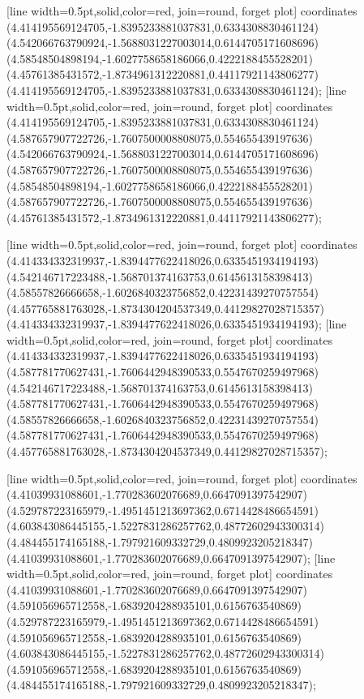 [line width=0.5pt,solid,color=red, join=round, forget plot] coordinates {(4.414195569124705,-1.8395233881037831,0.6334308830461124) (4.542066763790924,-1.5688031227003014,0.6144705171608696) (4.58548504898194,-1.6027758658186066,0.4222188455528201) (4.45761385431572,-1.8734961312220881,0.44117921143806277) (4.414195569124705,-1.8395233881037831,0.6334308830461124)};
[line width=0.5pt,solid,color=red, join=round, forget plot] coordinates {(4.414195569124705,-1.8395233881037831,0.6334308830461124) (4.587657907722726,-1.7607500008808075,0.554655439197636) (4.542066763790924,-1.5688031227003014,0.6144705171608696) (4.587657907722726,-1.7607500008808075,0.554655439197636) (4.58548504898194,-1.6027758658186066,0.4222188455528201) (4.587657907722726,-1.7607500008808075,0.554655439197636) (4.45761385431572,-1.8734961312220881,0.44117921143806277)};

[line width=0.5pt,solid,color=red, join=round, forget plot] coordinates {(4.414334332319937,-1.8394477622418026,0.6335451934194193) (4.542146717223488,-1.568701374163753,0.6145613158398413) (4.58557826666658,-1.6026840323756852,0.42231439270757554) (4.457765881763028,-1.8734304204537349,0.44129827028715357) (4.414334332319937,-1.8394477622418026,0.6335451934194193)};
[line width=0.5pt,solid,color=red, join=round, forget plot] coordinates {(4.414334332319937,-1.8394477622418026,0.6335451934194193) (4.587781770627431,-1.7606442948390533,0.5547670259497968) (4.542146717223488,-1.568701374163753,0.6145613158398413) (4.587781770627431,-1.7606442948390533,0.5547670259497968) (4.58557826666658,-1.6026840323756852,0.42231439270757554) (4.587781770627431,-1.7606442948390533,0.5547670259497968) (4.457765881763028,-1.8734304204537349,0.44129827028715357)};

[line width=0.5pt,solid,color=red, join=round, forget plot] coordinates {(4.41039931088601,-1.770283602076689,0.6647091397542907) (4.529787223165979,-1.4951451213697362,0.6714428486654591) (4.603843086445155,-1.5227831286257762,0.48772602943300314) (4.484455174165188,-1.797921609332729,0.4809923205218347) (4.41039931088601,-1.770283602076689,0.6647091397542907)};
[line width=0.5pt,solid,color=red, join=round, forget plot] coordinates {(4.41039931088601,-1.770283602076689,0.6647091397542907) (4.591056965712558,-1.6839204288935101,0.6156763540869) (4.529787223165979,-1.4951451213697362,0.6714428486654591) (4.591056965712558,-1.6839204288935101,0.6156763540869) (4.603843086445155,-1.5227831286257762,0.48772602943300314) (4.591056965712558,-1.6839204288935101,0.6156763540869) (4.484455174165188,-1.797921609332729,0.4809923205218347)};

